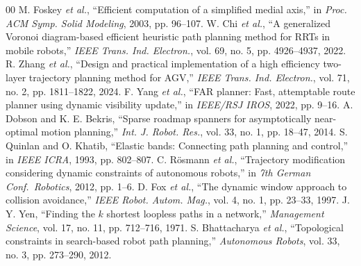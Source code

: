 \documentclass[conference]{IEEEtran}
\begin{document}
\begin{thebibliography}{00}
 M. Foskey \emph{et al.}, ``Efficient computation of a simplified medial axis,'' in \textit{Proc. ACM Symp. Solid Modeling}, 2003, pp. 96--107.
 W. Chi \emph{et al.}, ``A generalized Voronoi diagram-based efficient heuristic path planning method for RRTs in mobile robots,'' \textit{IEEE Trans. Ind. Electron.}, vol. 69, no. 5, pp. 4926--4937, 2022.
 R. Zhang \emph{et al.}, ``Design and practical implementation of a high efficiency two-layer trajectory planning method for AGV,'' \textit{IEEE Trans. Ind. Electron.}, vol. 71, no. 2, pp. 1811--1822, 2024.
 F. Yang \emph{et al.}, ``FAR planner: Fast, attemptable route planner using dynamic visibility update,'' in \textit{IEEE/RSJ IROS}, 2022, pp. 9--16.
 A. Dobson and K. E. Bekris, ``Sparse roadmap spanners for asymptotically near-optimal motion planning,'' \textit{Int. J. Robot. Res.}, vol. 33, no. 1, pp. 18--47, 2014.
 S. Quinlan and O. Khatib, ``Elastic bands: Connecting path planning and control,'' in \textit{IEEE ICRA}, 1993, pp. 802--807.
 C. R\"osmann \emph{et al.}, ``Trajectory modification considering dynamic constraints of autonomous robots,'' in \textit{7th German Conf.\ Robotics}, 2012, pp. 1--6.
 D. Fox \emph{et al.}, ``The dynamic window approach to collision avoidance,'' \textit{IEEE Robot. Autom. Mag.}, vol. 4, no. 1, pp. 23--33, 1997.
 J. Y. Yen, ``Finding the $k$ shortest loopless paths in a network,'' \textit{Management Science}, vol. 17, no. 11, pp. 712--716, 1971.
 S. Bhattacharya \emph{et al.}, ``Topological constraints in search-based robot path planning,'' \textit{Autonomous Robots}, vol. 33, no. 3, pp. 273--290, 2012.
\end{thebibliography}
\end{document}

